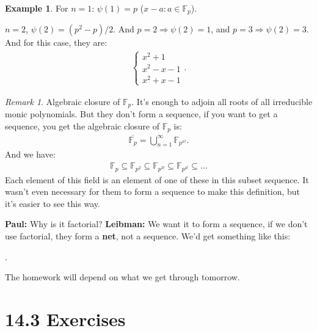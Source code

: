 \documentclass[9pt,reqno,twoside]{amsbook}
\theoremstyle{plain}
\numberwithin{section}{chapter}
\numberwithin{equation}{chapter}
\theoremstyle{definition}
\newtheorem{Ex}[theorem]{Example}
\theoremstyle{remark}
\newtheorem{rem}[theorem]{Remark}
\theoremstyle{plain}
\newcommand{\sub}{\subseteq}
\newcommand{\F}{\mathbb{F}}
\newcommand{\bee}{\begin{equation}\begin{aligned}}
\newcommand{\eee}{\end{aligned}\end{equation}}
\renewcommand{\bar}{\overline}%
\begin{document}
\begin{Ex}
For $n = 1$: $\psi(1) = p$ ($x - a:a \in \F_p$). 

$n = 2$, $\psi(2) = (p^2 - p)/2$. And $p = 2 \Rightarrow \psi(2) = 1$, and $p = 3 \Rightarrow \psi(2) = 3$. And for this case, they are:
\bee
\begin{cases}
x^2 + 1\\
x^2 - x - 1\\
x^2 + x - 1
\end{cases}.
\eee
\end{Ex}

\begin{rem}
Algebraic closure of $\F_p$. It's enough to adjoin all roots of all irreducible monic polynomials. But they don't form a sequence, if you want to get a sequence, you get the algebraic closure of $\F_p$ is:
\bee
\bar{\F_p} = \bigcup_{n  = 1}^\infty \F_{p^{n!}}.
\eee
And we have:
\bee
\F_p \sub \F_{p^2} \sub \F_{p^{3!}} \sub \F_{p^{4!}} \sub ...
\eee
Each element of this field is an element of one of these in this subset sequence. It wasn't even necessary for them to form a sequence to make this definition, but it's easier to see this way. 

\textbf{Paul: }Why is it factorial?
\textbf{Leibman: }We want it to form a sequence, if we don't use factorial, they form a \textbf{net}, not a sequence. We'd get something like this:
\begin{center}
.
\end{center}
\end{rem}

The homework will depend on what we get through tomorrow. 





\section*{14.3 Exercises}
\end{document}
